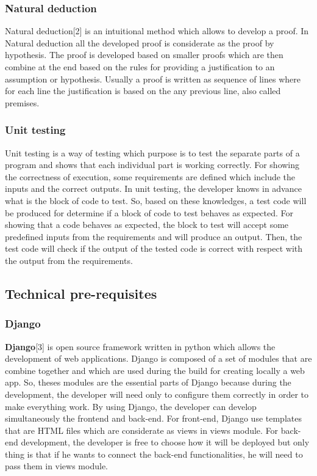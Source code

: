 \documentclass[conference,compsoc]{IEEEtran}
\begin{document}
\subsubsection{Natural deduction}
Natural deduction[2] is an intuitional method which allows to develop a proof. In Natural deduction all the developed proof is considerate as the proof by hypothesis. The proof is developed based on smaller proofs which are then combine at the end based on the rules for providing a justification to an assumption or hypothesis. Usually a proof is written as sequence of lines where for each line the justification is based on the any previous line, also called premises. 

\subsubsection{Unit testing}
Unit testing is a way of testing which purpose is to test the separate parts of a program and shows that each individual part is working correctly. For showing the correctness of execution, some requirements are defined which include the inputs and the correct outputs. In unit testing, the developer knows in advance what is the block of code to test. So, based on these knowledges, a test code will be produced for determine if a block of code to test behaves as expected. For showing that a code behaves as expected, the block to test will accept some predefined inputs from the requirements and will produce an output. Then, the test code will check if the output of the tested code is correct with respect with the output from the requirements.   

\subsection{Technical pre-requisites}
\subsubsection{Django}
\textbf{Django}[3] is open source framework written in python which allows the development of web applications. Django is composed of a set of modules that are combine together and which are used during the build for creating locally a web app. So, theses modules are the essential parts of Django because during the development, the developer will need only to configure them correctly in order to make everything work.  By using Django, the developer can develop simultaneously the frontend and back-end. For front-end, Django use templates that are HTML files which are considerate as views in views module. For back-end development, the developer is free to choose how it will be deployed but only thing is that if he wants to connect the back-end functionalities, he will need to pass them in views module. 
\end{document}
